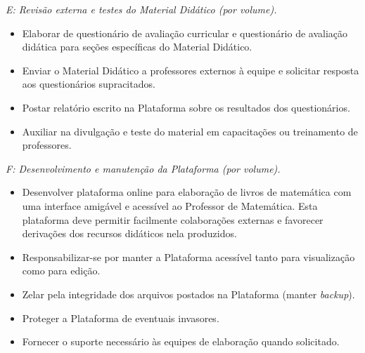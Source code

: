 \documentclass[10 pt]{article}
\begin{document}
{\it E: Revisão externa e testes do Material Didático (por volume).}
\begin{itemize} %
  \item     Elaborar de questionário de avaliação curricular e questionário de avaliação didática para seções específicas do Material Didático. 
  \item     Enviar o Material Didático a professores externos à equipe e solicitar resposta aos questionários supracitados.
  \item     Postar relatório escrito na Plataforma sobre os resultados dos questionários.
  \item     Auxiliar na divulgação e teste do material em capacitações ou treinamento de professores.
\end{itemize} %
\vspace{0.2cm}

{\it F: Desenvolvimento e manutenção da Plataforma (por volume).}
\begin{itemize} %
  \item     Desenvolver plataforma online para elaboração de livros de matemática com uma interface amigável e acessível ao Professor de Matemática. Esta plataforma deve permitir facilmente colaborações externas e favorecer derivações dos recursos didáticos nela produzidos.
  \item     Responsabilizar-se por manter a Plataforma acessível tanto para visualização como para edição.
  \item     Zelar pela integridade dos arquivos postados na Plataforma (manter {\it backup}).
  \item     Proteger a Plataforma de eventuais invasores.
  \item     Fornecer o suporte necessário às equipes de elaboração quando solicitado.
\end{itemize} %
\vspace{0.2cm}
\end{document}
